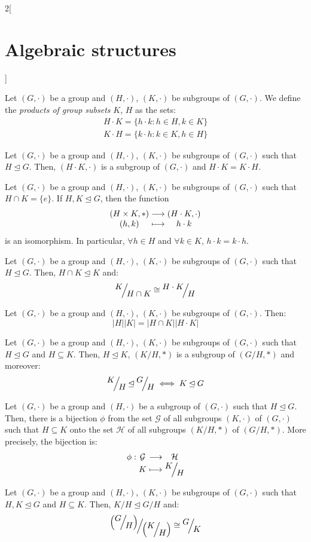 \documentclass[../../../main_math.tex]{subfiles}
\begin{document}
\begin{multicols}{2}[\section{Algebraic structures}]
\begin{definition}
    Let $(G,\cdot)$ be a group and $(H,\cdot)$, $(K,\cdot)$ be subgroups of $(G,\cdot)$. We define the \emph{products of group subsets} $K$, $H$ as the sets:
    \begin{gather*}
      H\cdot K=\{h\cdot k:h\in H,k\in K\}\\
      K\cdot H=\{k\cdot h:k\in K,h\in H\}
    \end{gather*}
  \end{definition}
  \begin{proposition}
    Let $(G,\cdot)$ be a group and $(H,\cdot)$, $(K,\cdot)$ be subgroups of $(G,\cdot)$ such that $H\unlhd G$. Then, $(H\cdot K,\cdot)$ is a subgroup of $(G,\cdot)$ and $H\cdot K=K\cdot H$.
  \end{proposition}
  \begin{proposition}
    Let $(G,\cdot)$ be a group and $(H,\cdot)$, $(K,\cdot)$ be subgroups of $(G,\cdot)$ such that $H\cap K=\{e\}$. If $H,K\unlhd G$, then the function
    $$\function{}{(H\times K,*)}{(H\cdot K,\cdot)}{(h,k)}{h\cdot k}$$
    is an isomorphism. In particular, $\forall h\in H$ and $\forall k\in K$, $h\cdot k=k\cdot h$.
  \end{proposition}
  \begin{theorem}
    Let $(G,\cdot)$ be a group and $(H,\cdot)$, $(K,\cdot)$ be subgroups of $(G,\cdot)$ such that $H\unlhd G$. Then, $H\cap K\unlhd K$ and: $$\quot{K}{H\cap K}\cong\quot{H\cdot K}{H}$$
  \end{theorem}
  \begin{corollary}
    Let $(G,\cdot)$ be a group and $(H,\cdot)$, $(K,\cdot)$ be subgroups of $(G,\cdot)$. Then: $$|H||K|=|H\cap K||H\cdot K|$$
  \end{corollary}
  \begin{lemma}
    Let $(G,\cdot)$ be a group and $(H,\cdot)$, $(K,\cdot)$ be subgroups of $(G,\cdot)$ such that $H\unlhd G$ and $H\subseteq K$. Then, $H\unlhd K$, $(K/H,*)$ is a subgroup of $(G/H,*)$ and moreover: $$\quot{K}{H}\unlhd\quot{G}{H}\iff K\unlhd G$$
  \end{lemma}
  \begin{theorem}
    Let $(G,\cdot)$ be a group and $(H,\cdot)$ be a subgroup of $(G,\cdot)$ such that $H\unlhd G$. Then, there is a bijection $\phi$ from the set $\mathcal{G}$ of all subgroups $(K,\cdot)$ of $(G,\cdot)$ such that $H\subseteq K$ onto the set $\mathcal{H}$ of all subgroups $\left(K/H,*\right)$ of $\left(G/H,*\right)$. More precisely, the bijection is:
    $$\function{\phi}{\mathcal{G}}{\mathcal{H}}{K}{\displaystyle\quot{K}{H}}$$
  \end{theorem}
  \begin{theorem}
    Let $(G,\cdot)$ be a group and $(H,\cdot)$, $(K,\cdot)$ be subgroups of $(G,\cdot)$ such that $H,K\unlhd G$ and $H\subseteq K$. Then, $K/H\unlhd G/H$ and: $$\quot{\left(\quot{G}{H}\right)}{\left(\quot{K}{H}\right)}\cong\quot{G}{K}$$
  \end{theorem}

\end{multicols}
\end{document}
